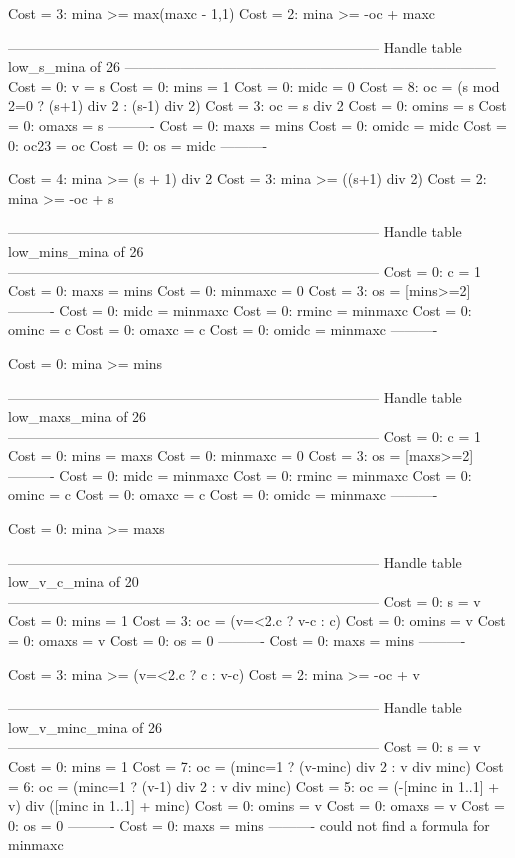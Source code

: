 Cost =  3:  mina >= max(maxc - 1,1)
Cost =  2:  mina >= -oc + maxc

--------------------------------------------------------------------------------
Handle table low_s_mina of 26
--------------------------------------------------------------------------------
Cost =  0:  v     = s
Cost =  0:  mins  = 1
Cost =  0:  midc  = 0
Cost =  8:  oc    = (s mod 2=0 ? (s+1) div 2 : (s-1) div 2)
Cost =  3:  oc    = s div 2
Cost =  0:  omins = s
Cost =  0:  omaxs = s
----------
Cost =  0:  maxs  = mins
Cost =  0:  omidc = midc
Cost =  0:  oc23  = oc
Cost =  0:  os    = midc
----------

Cost =  4:  mina >= (s + 1) div 2
Cost =  3:  mina >= ((s+1) div 2)
Cost =  2:  mina >= -oc + s

--------------------------------------------------------------------------------
Handle table low_mins_mina of 26
--------------------------------------------------------------------------------
Cost =  0:  c       = 1
Cost =  0:  maxs    = mins
Cost =  0:  minmaxc = 0
Cost =  3:  os      = [mins>=2]
----------
Cost =  0:  midc    = minmaxc
Cost =  0:  rminc   = minmaxc
Cost =  0:  ominc   = c
Cost =  0:  omaxc   = c
Cost =  0:  omidc   = minmaxc
----------

Cost =  0:  mina >= mins

--------------------------------------------------------------------------------
Handle table low_maxs_mina of 26
--------------------------------------------------------------------------------
Cost =  0:  c       = 1
Cost =  0:  mins    = maxs
Cost =  0:  minmaxc = 0
Cost =  3:  os      = [maxs>=2]
----------
Cost =  0:  midc    = minmaxc
Cost =  0:  rminc   = minmaxc
Cost =  0:  ominc   = c
Cost =  0:  omaxc   = c
Cost =  0:  omidc   = minmaxc
----------

Cost =  0:  mina >= maxs

--------------------------------------------------------------------------------
Handle table low_v_c_mina of 20
--------------------------------------------------------------------------------
Cost =  0:  s     = v
Cost =  0:  mins  = 1
Cost =  3:  oc    = (v=<2.c ? v-c : c)
Cost =  0:  omins = v
Cost =  0:  omaxs = v
Cost =  0:  os    = 0
----------
Cost =  0:  maxs  = mins
----------

Cost =  3:  mina >= (v=<2.c ? c : v-c)
Cost =  2:  mina >= -oc + v

--------------------------------------------------------------------------------
Handle table low_v_minc_mina of 26
--------------------------------------------------------------------------------
Cost =  0:  s       = v
Cost =  0:  mins    = 1
Cost =  7:  oc      = (minc=1 ? (v-minc) div 2 : v div minc)
Cost =  6:  oc      = (minc=1 ? (v-1) div 2 : v div minc)
Cost =  5:  oc      = (-[minc in 1..1] + v) div ([minc in 1..1] + minc)
Cost =  0:  omins   = v
Cost =  0:  omaxs   = v
Cost =  0:  os      = 0
----------
Cost =  0:  maxs    = mins
----------
could not find a formula for minmaxc

